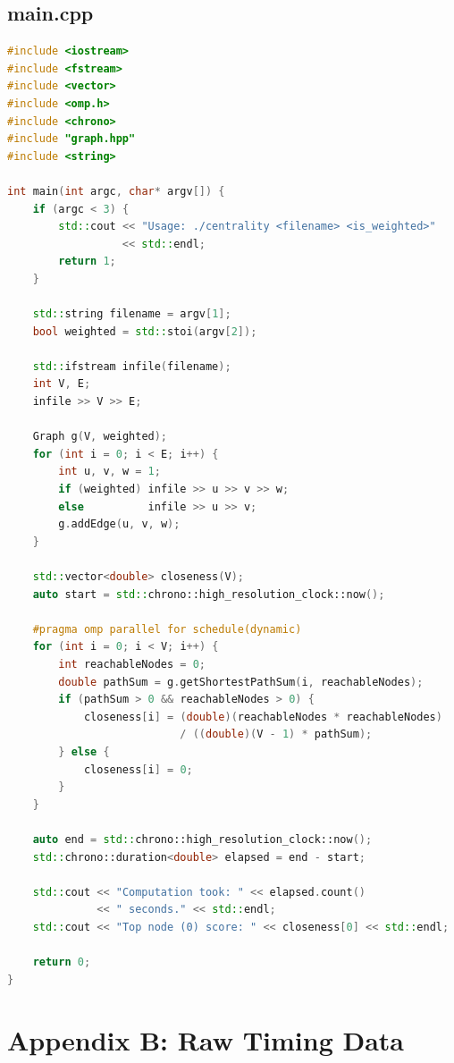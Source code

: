 \documentclass[12pt,a4paper]{article}
\begin{document}
\subsection*{main.cpp}
\begin{lstlisting}[language=C++, caption={main.cpp --- Driver with OpenMP parallel loop}]
#include <iostream>
#include <fstream>
#include <vector>
#include <omp.h>
#include <chrono>
#include "graph.hpp"
#include <string>

int main(int argc, char* argv[]) {
    if (argc < 3) {
        std::cout << "Usage: ./centrality <filename> <is_weighted>"
                  << std::endl;
        return 1;
    }

    std::string filename = argv[1];
    bool weighted = std::stoi(argv[2]);

    std::ifstream infile(filename);
    int V, E;
    infile >> V >> E;

    Graph g(V, weighted);
    for (int i = 0; i < E; i++) {
        int u, v, w = 1;
        if (weighted) infile >> u >> v >> w;
        else          infile >> u >> v;
        g.addEdge(u, v, w);
    }

    std::vector<double> closeness(V);
    auto start = std::chrono::high_resolution_clock::now();

    #pragma omp parallel for schedule(dynamic)
    for (int i = 0; i < V; i++) {
        int reachableNodes = 0;
        double pathSum = g.getShortestPathSum(i, reachableNodes);
        if (pathSum > 0 && reachableNodes > 0) {
            closeness[i] = (double)(reachableNodes * reachableNodes)
                           / ((double)(V - 1) * pathSum);
        } else {
            closeness[i] = 0;
        }
    }

    auto end = std::chrono::high_resolution_clock::now();
    std::chrono::duration<double> elapsed = end - start;

    std::cout << "Computation took: " << elapsed.count()
              << " seconds." << std::endl;
    std::cout << "Top node (0) score: " << closeness[0] << std::endl;

    return 0;
}
\end{lstlisting}

\section*{Appendix B: Raw Timing Data}
\end{document}
